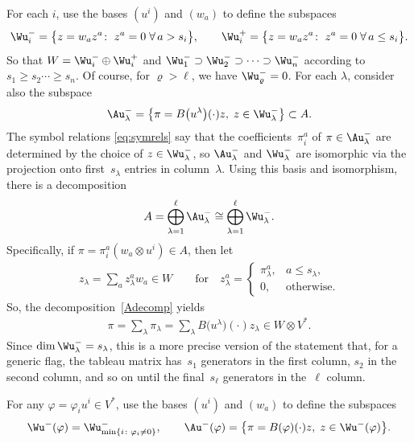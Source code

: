 For each $i$, use the bases $(u^i)$ and $(w_a)$ to def\/ine the subspaces
\begin{gather*}
\Wu^-_i = \big\{ z =w_a z^a\colon \; z^a = 0\; \forall\, a > s_i \big\}, \qquad
\Wu^+_i = \big\{ z =w_a z^a\colon \;  z^a = 0\; \forall\, a \leq s_i \big\}.
\end{gather*}
So that $W =  \Wu^-_i \oplus \Wu^+_i$ and $\Wu^-_1 \supset
\Wu^-_2 \supset \cdots \supset \Wu^-_n$ according to $s_1 \geq s_2
\cdots \geq s_n$.  Of course, for $\varrho > \ell$, we have
$\Wu^-_\varrho = 0$.  For each $\lambda$, consider also the subspace
\begin{gather*}
\Au^-_\lambda = \big\{ \pi = B\big(u^\lambda\big)(\cdot)z,\; z \in \Wu^-_\lambda\big\} \subset
A.
\end{gather*}
The symbol relations \eqref{eq:symrels} say that the coef\/f\/icients~$\pi^a_i$ of
$\pi \in \Au^-_\lambda$ are
determined by the choice of $z \in \Wu^-_\lambda$, so
$\Au^-_\lambda$ and $\Wu^-_\lambda$ are isomorphic
via the projection onto f\/irst~$s_\lambda$ entries in column~$\lambda$.
Using this basis and isomorphism, there is a decomposition
\begin{gather}
A = \bigoplus_{\lambda=1}^\ell \Au^-_\lambda \cong \bigoplus_{\lambda=1}^\ell
\Wu^-_\lambda.
\label{Adecomp}
\end{gather}
Specif\/ically, if $\pi = \pi^a_i (w_a \otimes u^i) \in A$, then let
\begin{gather*}
z_\lambda = \sum_a z^a_\lambda w_a \in W \qquad \text{for} \quad z^a_\lambda =
\begin{cases}
\pi^a_\lambda,& a \leq s_\lambda,\\
0, & \text{otherwise}.
\end{cases}
\label{zdecomp}
\end{gather*}
So, the decomposition~\eqref{Adecomp} yields
\begin{gather*}
\pi = \sum_\lambda \pi_\lambda = \sum_\lambda B\big(u^\lambda\big)(\cdot)z_\lambda \in
W \otimes V^*.
\end{gather*}
Since $\dim \Wu^-_\lambda = s_\lambda$, this is a more precise version of the statement
that, for a generic f\/lag, the tableau matrix has~$s_1$ generators in the f\/irst
column, $s_2$ in the second column, and so on until the f\/inal~$s_\ell$
generators in the~$\ell$ column.

For any $\varphi = \varphi_i u^i \in V^*$, use the bases $(u^i)$ and $(w_a)$ to def\/ine the subspaces
\begin{gather*}
\Wu^-(\varphi)  = \Wu^-_{\min\{i\colon  \varphi_i \neq 0\}},\qquad
\Au^-(\varphi)  = \big\{ \pi = B(\varphi)(\cdot)z,\; z \in \Wu^-(\varphi)\big\}.
\end{gather*}


